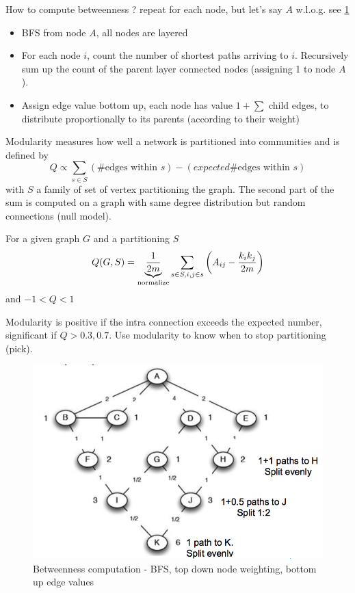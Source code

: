 How to compute betweenness ? repeat for each node, but let's say $A$ w.l.o.g. see \cref{fig:betweenness}

\begin{itemize}
  \item BFS from node $A$, all nodes are layered
  \item For each node $i$, count the number of shortest paths arriving to $i$. Recursively sum up the count of the parent layer connected nodes (assigning 1 to node $A$).
  \item Assign edge value bottom up, each node has value $1 + \sum $ child edges, to distribute proportionally to its parents (according to their weight)
\end{itemize}

\begin{definition}[Modularity]
  Modularity measures how well a network is partitioned into communities and is defined by 
  \[
    Q \propto \sum_{s \in S} (\text{\# edges within } s) - (expected \text{\# edges within } s)
  \]
  with $S$ a family of set of vertex partitioning the graph. The second part of the sum is computed on a graph with same degree distribution but random connections (null model).
\end{definition}


\begin{definition}
  For a given graph $G$ and a partitioning $S$
  \[
    Q(G,S) = \underbrace{\frac 1 {2m}}_{\text{normalize}} \sum_{s\in S, i,j\in s} \left(A_{ij} - \frac{k_ik_j}{2m}\right)
  \]
  and $-1<Q<1$
\end{definition}

Modularity is positive if the intra connection exceeds the expected number, significant if $Q>0.3,0.7$. Use modularity to know when to stop partitioning (pick).

\begin{figure}
  \centering
  \includegraphics[width=1\linewidth]{figures/betweenness_computation.png}
  \caption{Betweenness computation - BFS, top down node weighting, bottom up edge values}
  \label{fig:betweenness}
\end{figure}

